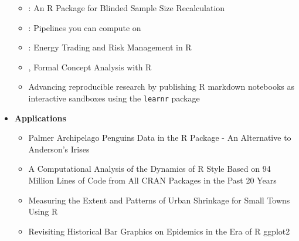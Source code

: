 \begin{itemize}
  \begin{itemize}
  \tightlist
  \item
    : An R Package for Blinded Sample Size Recalculation
  \item
    : Pipelines you can compute on
  \item
    : Energy Trading and Risk Management in R
  \item
    , Formal Concept Analysis with R
  \item
    Advancing reproducible research by publishing R markdown notebooks as interactive sandboxes using the \texttt{learnr} package
  \end{itemize}
\item
  \textbf{Applications}

  \begin{itemize}
  \tightlist
  \item
    Palmer Archipelago Penguins Data in the  R Package - An Alternative to Anderson's Irises
  \item
    A Computational Analysis of the Dynamics of R Style Based on 94 Million Lines of Code from All CRAN Packages in the Past 20 Years
  \item
    Measuring the Extent and Patterns of Urban Shrinkage for Small Towns Using R
  \item
    Revisiting Historical Bar Graphics on Epidemics in the Era of R ggplot2
  \end{itemize}
\end{itemize}


\address{%
Catherine Hurley\\
Maynooth University\\%
\\
%
\url{https://journal.r-project.org}\\%
%
\href{mailto:r-journal@r-project.org}{\nolinkurl{r-journal@r-project.org}}%
}
